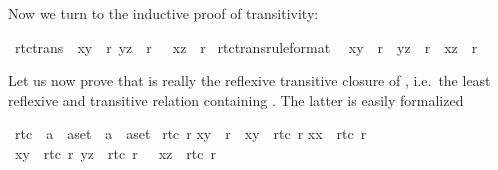 \begin{isabellebody}
\begin{isamarkuptext}
Now we turn to the inductive proof of transitivity:%
\end{isamarkuptext}%
\isamarkuptrue%
\ rtc{\isacharunderscore}trans{\isacharcolon}\ {\isachardoublequote}{\isasymlbrakk}\ {\isacharparenleft}x{\isacharcomma}y{\isacharparenright}\ {\isasymin}\ r{\isacharasterisk}{\isacharsemicolon}\ {\isacharparenleft}y{\isacharcomma}z{\isacharparenright}\ {\isasymin}\ r{\isacharasterisk}\ {\isasymrbrakk}\ {\isasymLongrightarrow}\ {\isacharparenleft}x{\isacharcomma}z{\isacharparenright}\ {\isasymin}\ r{\isacharasterisk}{\isachardoublequote}\isanewline
\isamarkupfalse%
\isamarkupfalse%
\isamarkuptrue%
\isamarkupfalse%
\ rtc{\isacharunderscore}trans{\isacharbrackleft}rule{\isacharunderscore}format{\isacharbrackright}{\isacharcolon}\isanewline
\ \ {\isachardoublequote}{\isacharparenleft}x{\isacharcomma}y{\isacharparenright}\ {\isasymin}\ r{\isacharasterisk}\ {\isasymLongrightarrow}\ {\isacharparenleft}y{\isacharcomma}z{\isacharparenright}\ {\isasymin}\ r{\isacharasterisk}\ {\isasymlongrightarrow}\ {\isacharparenleft}x{\isacharcomma}z{\isacharparenright}\ {\isasymin}\ r{\isacharasterisk}{\isachardoublequote}\isamarkupfalse%
\isamarkuptrue%
\isamarkupfalse%
\isamarkuptrue%
\isamarkupfalse%
\isamarkupfalse%
\isamarkupfalse%
%
\begin{isamarkuptext}%
Let us now prove that  is really the reflexive transitive closure
of , i.e.\ the least reflexive and transitive
relation containing . The latter is easily formalized%
\end{isamarkuptext}%
\isamarkuptrue%
\ rtc{}\ {\isacharcolon}{\isacharcolon}\ {\isachardoublequote}{\isacharparenleft}{\isacharprime}a\ {\isasymtimes}\ {\isacharprime}a{\isacharparenright}set\ {\isasymRightarrow}\ {\isacharparenleft}{\isacharprime}a\ {\isasymtimes}\ {\isacharprime}a{\isacharparenright}set{\isachardoublequote}\isanewline
\isamarkupfalse%
\ {\isachardoublequote}rtc{}\ r{\isachardoublequote}\isanewline
{}\isanewline
{\isachardoublequote}{\isacharparenleft}x{\isacharcomma}y{\isacharparenright}\ {\isasymin}\ r\ {\isasymLongrightarrow}\ {\isacharparenleft}x{\isacharcomma}y{\isacharparenright}\ {\isasymin}\ rtc{}\ r{\isachardoublequote}\isanewline
{\isachardoublequote}{\isacharparenleft}x{\isacharcomma}x{\isacharparenright}\ {\isasymin}\ rtc{}\ r{\isachardoublequote}\isanewline
{\isachardoublequote}{\isasymlbrakk}\ {\isacharparenleft}x{\isacharcomma}y{\isacharparenright}\ {\isasymin}\ rtc{}\ r{\isacharsemicolon}\ {\isacharparenleft}y{\isacharcomma}z{\isacharparenright}\ {\isasymin}\ rtc{}\ r\ {\isasymrbrakk}\ {\isasymLongrightarrow}\ {\isacharparenleft}x{\isacharcomma}z{\isacharparenright}\ {\isasymin}\ rtc{}\ r{\isachardoublequote}\isamarkupfalse%

\end{isabellebody}
